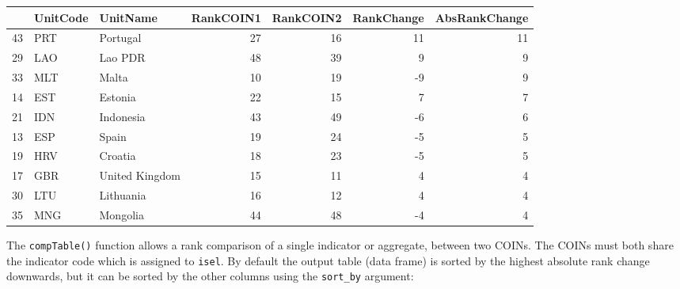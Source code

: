 \documentclass[
]{book}
\newenvironment{Shaded}{\begin{snugshade}}{\end{snugshade}}
\newcommand{\DataTypeTok}[1]{\textcolor[rgb]{0.13,0.29,0.53}{#1}}
\newcommand{\DecValTok}[1]{\textcolor[rgb]{0.00,0.00,0.81}{#1}}
\newcommand{\KeywordTok}[1]{\textcolor[rgb]{0.13,0.29,0.53}{\textbf{#1}}}
\newcommand{\NormalTok}[1]{#1}
\newcommand{\OperatorTok}[1]{\textcolor[rgb]{0.81,0.36,0.00}{\textbf{#1}}}
\newcommand{\StringTok}[1]{\textcolor[rgb]{0.31,0.60,0.02}{#1}}
\begin{document}
\begin{Shaded}
\end{Shaded}

\begin{tabular}{l|l|l|r|r|r|r}
\hline
  & UnitCode & UnitName & RankCOIN1 & RankCOIN2 & RankChange & AbsRankChange\\
\hline
43 & PRT & Portugal & 27 & 16 & 11 & 11\\
\hline
29 & LAO & Lao PDR & 48 & 39 & 9 & 9\\
\hline
33 & MLT & Malta & 10 & 19 & -9 & 9\\
\hline
14 & EST & Estonia & 22 & 15 & 7 & 7\\
\hline
21 & IDN & Indonesia & 43 & 49 & -6 & 6\\
\hline
13 & ESP & Spain & 19 & 24 & -5 & 5\\
\hline
19 & HRV & Croatia & 18 & 23 & -5 & 5\\
\hline
17 & GBR & United Kingdom & 15 & 11 & 4 & 4\\
\hline
30 & LTU & Lithuania & 16 & 12 & 4 & 4\\
\hline
35 & MNG & Mongolia & 44 & 48 & -4 & 4\\
\hline
\end{tabular}

The \texttt{compTable()} function allows a rank comparison of a single indicator or aggregate, between two COINs. The COINs must both share the indicator code which is assigned to \texttt{isel}. By default the output table (data frame) is sorted by the highest absolute rank change downwards, but it can be sorted by the other columns using the \texttt{sort\_by} argument:

\begin{Shaded}
\end{Shaded}
\end{document}
